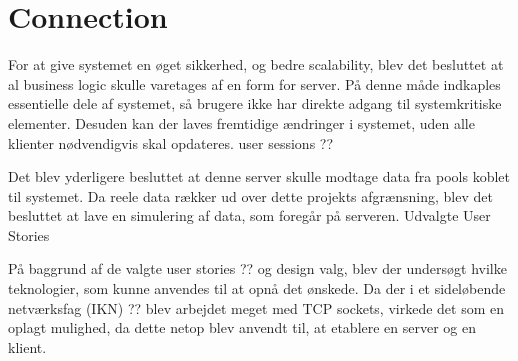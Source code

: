 \section{Connection}\label{sec:designconnection}

For at give systemet en øget sikkerhed, og bedre scalability, blev det besluttet at al business logic skulle varetages af en form for server. På denne måde indkaples essentielle dele af systemet, så brugere ikke har direkte adgang til systemkritiske elementer. Desuden kan der laves fremtidige ændringer i systemet, uden alle klienter nødvendigvis skal opdateres.
user sessions ??

Det blev yderligere besluttet at denne server skulle modtage data fra pools koblet til systemet. Da reele data rækker ud over dette projekts afgrænsning, blev det besluttet at lave en simulering af data, som foregår på serveren.
Udvalgte User Stories

På baggrund af de valgte user stories ?? og design valg, blev der undersøgt hvilke teknologier, som kunne anvendes til at opnå det ønskede. Da der i et sideløbende netværksfag (IKN) ?? blev arbejdet meget med TCP sockets, virkede det som en oplagt mulighed, da dette netop blev anvendt til, at etablere en server og en klient.
